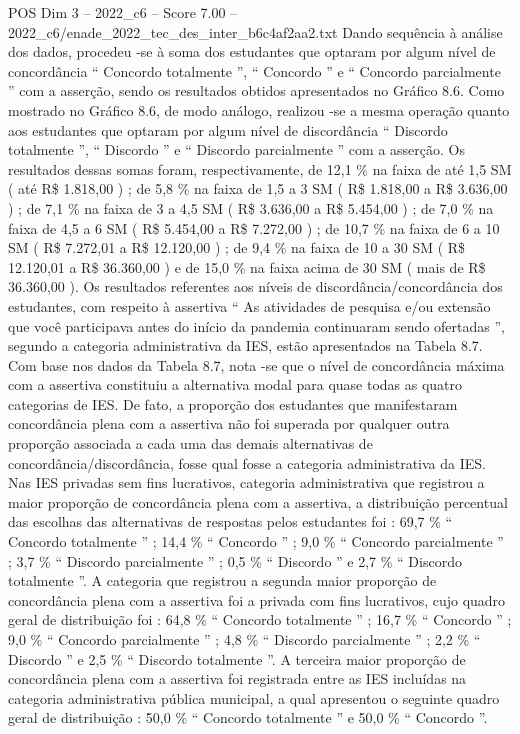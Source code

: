 \begin{textsample}{POS Dim 3 – 2022\_c6 – Score 7.00 – 2022\_c6/enade\_2022\_tec\_des\_inter\_b6c4af2aa2.txt}
Dando sequência à análise dos dados, procedeu -se à soma dos estudantes que optaram por algum nível de concordância “ Concordo totalmente ”, “ Concordo ” e “ Concordo parcialmente ” com a asserção, sendo os resultados obtidos apresentados no Gráfico 8.6.
Como mostrado no Gráfico 8.6, de modo análogo, realizou -se a mesma operação quanto aos estudantes que optaram por algum nível de discordância “ Discordo totalmente ”, “ Discordo ” e “ Discordo parcialmente ” com a asserção.
Os resultados dessas somas foram, respectivamente, de 12,1 \% na faixa de até 1,5 SM ( até R\$ 1.818,00 ) ; de 5,8 \% na faixa de 1,5 a 3 SM ( R\$ 1.818,00 a R\$ 3.636,00 ) ; de 7,1 \% na faixa de 3 a 4,5 SM ( R\$ 3.636,00 a R\$ 5.454,00 ) ; de 7,0 \% na faixa de 4,5 a 6 SM ( R\$ 5.454,00 a R\$ 7.272,00 ) ; de 10,7 \% na faixa de 6 a 10 SM ( R\$ 7.272,01 a R\$ 12.120,00 ) ; de 9,4 \% na faixa de 10 a 30 SM ( R\$ 12.120,01 a R\$ 36.360,00 ) e de 15,0 \% na faixa acima de 30 SM ( mais de R\$ 36.360,00 ).
Os resultados referentes aos níveis de discordância/concordância dos estudantes, com respeito à assertiva “ As atividades de pesquisa e/ou extensão que você participava antes do início da pandemia continuaram sendo ofertadas ”, segundo a categoria administrativa da IES, estão apresentados na Tabela 8.7.
Com base nos dados da Tabela 8.7, nota -se que o nível de concordância máxima com a assertiva constituiu a alternativa modal para quase todas as quatro categorias de IES.
De fato, a proporção dos estudantes que manifestaram concordância plena com a assertiva não foi superada por qualquer outra proporção associada a cada uma das demais alternativas de concordância/discordância, fosse qual fosse a categoria administrativa da IES.
Nas IES privadas sem fins lucrativos, categoria administrativa que registrou a maior proporção de concordância plena com a assertiva, a distribuição percentual das escolhas das alternativas de respostas pelos estudantes foi : 69,7 \% “ Concordo totalmente ” ; 14,4 \% “ Concordo ” ; 9,0 \% “ Concordo parcialmente ” ; 3,7 \% “ Discordo parcialmente ” ; 0,5 \% “ Discordo ” e 2,7 \% “ Discordo totalmente ”.
A categoria que registrou a segunda maior proporção de concordância plena com a assertiva foi a privada com fins lucrativos, cujo quadro geral de distribuição foi : 64,8 \% “ Concordo totalmente ” ; 16,7 \% “ Concordo ” ; 9,0 \% “ Concordo parcialmente ” ; 4,8 \% “ Discordo parcialmente ” ; 2,2 \% “ Discordo ” e 2,5 \% “ Discordo totalmente ”.
A terceira maior proporção de concordância plena com a assertiva foi registrada entre as IES incluídas na categoria administrativa pública municipal, a qual apresentou o seguinte quadro geral de distribuição : 50,0 \% “ Concordo totalmente ” e 50,0 \% “ Concordo ”.

\end{textsample}
